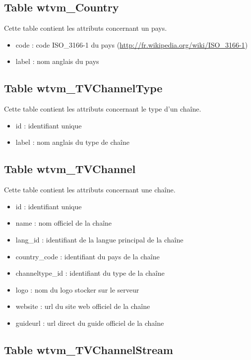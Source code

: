 \documentclass[10pt,a4paper]{article}
\begin{document}
\subsection{Table wtvm\_Country}

Cette table contient les attributs concernant un pays.

\begin{itemize}
\item code : code ISO\_3166-1 du pays (\url{http://fr.wikipedia.org/wiki/ISO\_3166-1})
\item label : nom anglais du pays
\end{itemize}

\subsection{Table wtvm\_TVChannelType}

Cette table contient les attributs concernant le type d'un chaîne.

\begin{itemize}
\item id : identifiant unique
\item label : nom anglais du type de chaîne
\end{itemize}

\subsection{Table wtvm\_TVChannel}

Cette table contient les attributs concernant une chaîne.

\begin{itemize}
\item id : identifiant unique
\item name : nom officiel de la chaîne
\item lang\_id : identifiant de la langue principal de la chaîne
\item country\_code : identifiant du pays de la chaîne
\item channeltype\_id : identifiant du type de la chaîne
\item logo : nom du logo stocker sur le serveur
\item website : url du site web officiel de la chaîne
\item guideurl : url direct du guide officiel de la chaîne
\end{itemize}

\subsection{Table wtvm\_TVChannelStream}
\end{document}
